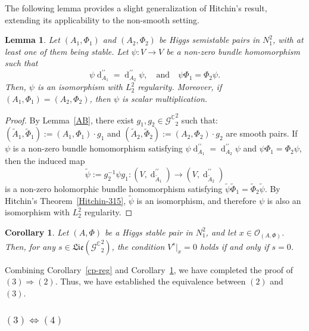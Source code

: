 \documentclass[a4paper]{amsart}
\newtheorem{lemma}[theorem]{Lemma}
\newtheorem{cor}[theorem]{Corollary}
\theoremstyle{definition}
\theoremstyle{remark}
\numberwithin{equation}{section}
\begin{document}
The following lemma provides a slight generalization of Hitchin’s result, extending its applicability to the non-smooth setting.

\begin{lemma}\label{Hitchin315}
Let $(A_1, \Phi_1)$ and $(A_2, \Phi_2)$ be Higgs semistable pairs in $N_1^2$, with at least one of them being stable. Let $\psi: V \to V$ be a non-zero bundle homomorphism such that 
\[
\psi \operatorname{d}^{\prime\prime}_{A_1} = \operatorname{d}^{\prime\prime}_{A_2} \psi, \quad \text{and} \quad \psi \Phi_1 = \Phi_2 \psi.
\]
Then, $\psi$ is an isomorphism with $L_2^2$ regularity. Moreover, if $(A_1, \Phi_1) = (A_2, \Phi_2)$, then $\psi$ is scalar multiplication.
\end{lemma}

\begin{proof}
By Lemma~\ref{AB}, there exist $g_1, g_2 \in {\mathscr{G}^\mathbb{C}}_2^2$ such that: $(\tilde{A}_1, \tilde{\Phi}_1) := (A_1, \Phi_1) \cdot g_1$ and $ (\tilde{A}_2, \tilde{\Phi}_2) := (A_2, \Phi_2) \cdot g_2$ are smooth pairs. If $\psi$ is a non-zero bundle homomorphism satisfying $\psi \operatorname{d}^{\prime\prime}_{A_1} = \operatorname{d}^{\prime\prime}_{A_2} \psi$ and $\psi \Phi_1 = \Phi_2 \psi$, then the induced map 
\[
\tilde{\psi} := g_2^{-1} \psi g_1 : (V, \operatorname{d}^{\prime\prime}_{\tilde{A}_1}) \to (V, \operatorname{d}^{\prime\prime}_{\tilde{A}_2})
\]
is a non-zero holomorphic bundle homomorphism satisfying $\tilde{\psi} \tilde{\Phi}_1 = \tilde{\Phi}_2 \tilde{\psi}$. By Hitchin's Theorem~\ref{Hitchin-315}, $\tilde{\psi}$ is an isomorphism, and therefore $\psi$ is also an isomorphism with $L_2^2$ regularity.
\end{proof}

\begin{cor}\label{s=0}
Let $(A, \Phi)$ be a Higgs stable pair in $N_1^2$, and let $x \in \mathcal{O}_{(A, \Phi)}$. Then, for any $s \in \mathfrak{Lie}({\mathscr{G}^\mathbb{C}}_2^2)$, the condition $V^s|_x = 0$ holds if and only if $s = 0$. 
\end{cor}

Combining Corollary~\ref{cp-reg} and Corollary~\ref{s=0}, we have completed the proof of $(3) \Rightarrow (2)$. Thus, we have established the equivalence between $(2)$ and $(3)$.

\subsubsection{$(3) \Leftrightarrow (4)$}
\end{document}
